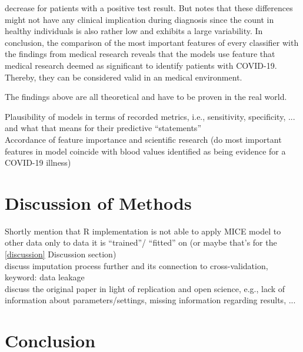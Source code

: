 decrease for patients with a positive test result. But \cite{RN162} notes that 
these differences might not have any clinical implication during diagnosis since 
the count in healthy individuals is also rather low and exhibits a large 
variability.
In conclusion, the comparison of the most important features of every 
classifier with the findings from medical research reveals that the models use 
feature that medical research deemed as significant to identify patients with 
COVID-19. Thereby, they can be considered valid in an medical environment.
\par
The findings above are all theoretical and have to be proven in the real world.
\begin{changemargin}{50pt}{50pt}
 Plausibility of models in terms of recorded metrics, i.e., sensitivity, 
specificity, ... and what that means for their predictive ``statements''
\\
Accordance of feature importance and scientific research (do most important 
features in model coincide with blood values identified as being evidence for a 
COVID-19 illness)
\end{changemargin}
\section{Discussion of Methods}
\begin{changemargin}{50pt}{50pt}
Shortly mention that R implementation is not able to apply MICE model to other 
data only to data it is ``trained''/ ``fitted'' on (or maybe that's for the 
\ref{discussion} Discussion section)
\\
discuss imputation process further and its connection to cross-validation, 
keyword: data leakage
\\
discuss the original paper in light of replication and open science, e.g., lack 
of information about parameters/settings, missing information regarding 
results, ...
\end{changemargin}
\section{Conclusion}
